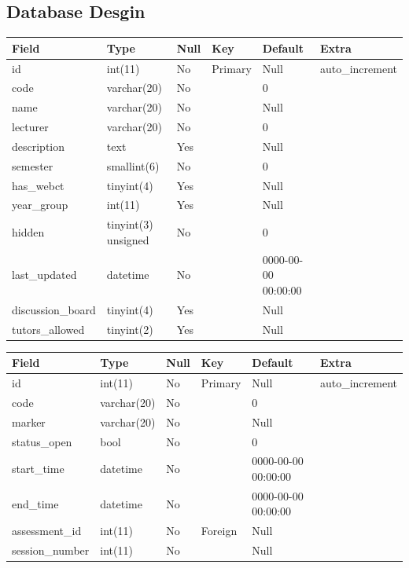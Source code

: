 \documentclass[12pt]{article}
\begin{document}
		\subsection{Database Desgin} %
						
				
					\begin{tabular}{|p{1.0in}|p{0.9in}|p{0.5in}|p{0.4in}|p{1.0in}|p{0.9in}|} \hline 
					Field & Type & Null & Key & Default & Extra \\ \hline 
					id & int(11) & No & Primary & Null & auto\_increment \\ \hline 
					code & varchar(20) & No &  & 0 &  \\ \hline 
					name & varchar(20) & No &  & Null &  \\ \hline 
					lecturer  & varchar(20) & No &  & 0 &  \\ \hline 
					description & text & Yes &  & Null &  \\ \hline 
					semester & smallint(6) & No &  & 0 &  \\ \hline 
					has\_webct & tinyint(4) & Yes &  & Null &  \\ \hline 
					year\_group & int(11) & Yes &  & Null &  \\ \hline 
					hidden & tinyint(3) unsigned & No &  & 0 &  \\ \hline 
					last\_updated & datetime & No &  & 0000-00-00 00:00:00 &  \\ \hline 
					discussion\_board & tinyint(4) & Yes &  & Null &  \\ \hline 
					tutors\_allowed & tinyint(2) & Yes &  & Null &  \\ 
					\hline 
					\end{tabular}



					\begin{tabular}{|p{1.0in}|p{0.9in}|p{0.5in}|p{0.4in}|p{1.0in}|p{0.9in}|} \hline 
					Field & Type & Null & Key & Default & Extra \\ \hline 
					id & int(11) & No & Primary & Null & auto\_increment \\ \hline 
					code & varchar(20) & No &  & 0 &  \\ \hline 
					marker & varchar(20) & No &  & Null &  \\ \hline 
					status\_open & bool & No &  & 0 &  \\ \hline 
					start\_time & datetime & No &  & 0000-00-00 00:00:00 &  \\ \hline 
					end\_time & datetime & No &  & 0000-00-00 00:00:00 &  \\ \hline 
					assessment\_id & int(11) & No & Foreign & Null &  \\ \hline 
					session\_number & int(11) & No &  & Null &  \\ \hline 
					\end{tabular}
					
\end{document}
